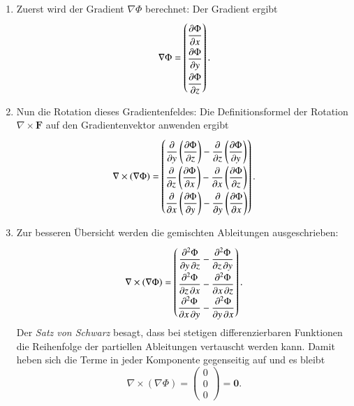 \begin{enumerate}
    \item Zuerst wird der Gradient $\nabla\Phi$ berechnet:
    Der Gradient ergibt
    \[
    \nabla \Phi =
	\renewcommand{\arraystretch}{2.0}
    \begin{pmatrix}
        \displaystyle \frac{\partial \Phi}{\partial x} \\
        \displaystyle \frac{\partial \Phi}{\partial y} \\
        \displaystyle \frac{\partial \Phi}{\partial z}
    \end{pmatrix}.
    \]

    \item Nun die Rotation dieses Gradientenfeldes: Die Definitionsformel der Rotation $\nabla \times \boldsymbol{F}$ auf den Gradientenvektor anwenden ergibt
    \[
    \nabla \times (\nabla \Phi) =
	\renewcommand{\arraystretch}{2.0}
    \begin{pmatrix}
        \displaystyle\frac{\partial}{\partial y}\left(\frac{\partial \Phi}{\partial z}\right) - \frac{\partial}{\partial z}\left(\frac{\partial \Phi}{\partial y}\right) \\
        \displaystyle\frac{\partial}{\partial z}\left(\frac{\partial \Phi}{\partial x}\right) - \frac{\partial}{\partial x}\left(\frac{\partial \Phi}{\partial z}\right) \\
        \displaystyle\frac{\partial}{\partial x}\left(\frac{\partial \Phi}{\partial y}\right) - \frac{\partial}{\partial y}\left(\frac{\partial \Phi}{\partial x}\right)
    \end{pmatrix}.
    \]

    \item %
    
    Zur besseren Übersicht werden die gemischten Ableitungen ausgeschrieben:
    \[
    \nabla \times (\nabla \Phi) =
	\renewcommand{\arraystretch}{2.0}
    \begin{pmatrix}
        \displaystyle\frac{\partial^2 \Phi}{\partial y\, \partial z} - \frac{\partial^2 \Phi}{\partial z\, \partial y} \\
        \displaystyle\frac{\partial^2 \Phi}{\partial z\, \partial x} - \frac{\partial^2 \Phi}{\partial x\, \partial z} \\
        \displaystyle\frac{\partial^2 \Phi}{\partial x\, \partial y} - \frac{\partial^2 \Phi}{\partial y\, \partial x}
    \end{pmatrix}.
    \]
    Der \emph{Satz von Schwarz} besagt, dass bei stetigen differenzierbaren
    Funktionen die Reihenfolge der partiellen Ableitungen vertauscht werden
    kann.
    Damit heben sich die Terme in jeder Komponente gegenseitig auf und es bleibt
    \[
    \nabla \times (\nabla \Phi)  =
    \begin{pmatrix}
        0 \\
        0 \\
        0
    \end{pmatrix} = \boldsymbol{0}.
    \]
\end{enumerate}


